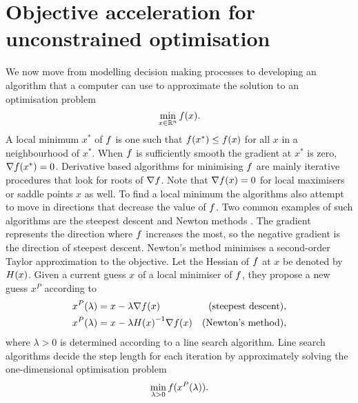 \documentclass[main.tex]{subfiles}
\begin{document}
\chapter{Objective acceleration for unconstrained optimisation}\label{ch:objaccel}

We now move from modelling decision making processes
to developing an algorithm that a computer
can use to approximate the solution to an optimisation problem
\begin{equation}
  \min_{x\in\mathbb{R}^n} f(x).
\end{equation}
A local minimum $x^*$ of $f$ is one such that
$f(x^*)\leq f(x)$ for all $x$ in a neighbourhood of $x^*$.  When
$f$ is sufficiently smooth the gradient at $x^*$ is zero,
$\nabla f(x^*)=0$.  Derivative based algorithms for minimising
$f$ are mainly iterative procedures that look for roots of
$\nabla f$.  Note that $\nabla f(x)=0$ for local maximisers or
saddle points $x$ as well. To find a local minimum the algorithms also
attempt to move in directions that decrease the value of
$f$.  Two common examples of such algorithms are the steepest
descent and Newton methods \citep{nocedal2006numerical}.  The gradient
represents the direction where $f$ increases the most, so the
negative gradient is the direction of steepest descent. Newton's
method minimises a second-order Taylor approximation to the objective.
Let the Hessian of $f$ at $x$ be denoted by $H(x)$.  Given a
current guess $x$ of a local minimiser of $f$, they propose a new
guess $x^P$ according to
\begin{align}\label{eq:steepest_descent_step}
  x^P(\lambda)
  &= x - \lambda \nabla f(x)
  &\textnormal{(steepest descent)}&,\\
  x^P(\lambda)
  &= x-\lambda {H(x)}^{-1}\nabla f(x)
  &\textnormal{(Newton's method)}&,\label{eq:newton_step}
\end{align}
where $\lambda>0$ is determined according to a line search algorithm.
Line search algorithms decide the step length for each iteration by
approximately solving the one-dimensional optimisation problem
\begin{equation}
  \min_{\lambda>0} f(x^P(\lambda)).
\end{equation}
\end{document}
